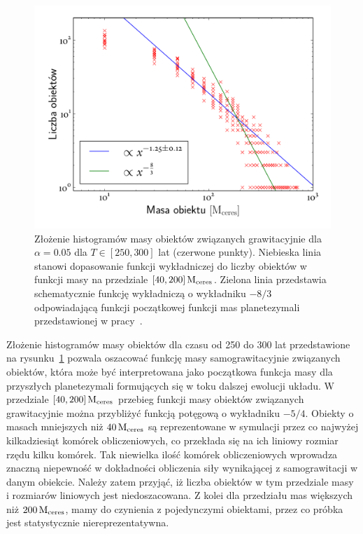 \begin{figure}[ht]
   \centering
   \includegraphics[width=0.7\linewidth]{figures/mass_func}
   \caption{Złożenie histogramów masy obiektów związanych grawitacyjnie dla
   $\alpha = 0.05$ dla $T \in [250, 300]$ lat (czerwone punkty). Niebieska linia
stanowi dopasowanie funkcji wykładniczej do liczby obiektów w funkcji masy na
przedziale $[40,200]\hbox{$\mathrm{\thinspace M_{\textrm{ceres}}}$}$. Zielona linia przedstawia schematycznie funkcję
wykładniczą o wykładniku $-8/3$ odpowiadającą funkcji początkowej funkcji mas
planetezymali przedstawionej w pracy~\cite{MFFK98}.}
   \label{fig:massfun}
\end{figure}
%
\par Złożenie histogramów masy obiektów dla czasu od 250 do 300 lat
przedstawione na rysunku~\ref{fig:massfun} pozwala oszacować funkcję masy
samograwitacyjnie związanych obiektów, która może być interpretowana jako
początkowa funkcja masy dla przyszłych planetezymali formujących się w toku
dalszej ewolucji układu. W przedziale $[40, 200]\hbox{$\mathrm{\thinspace M_{\textrm{ceres}}}$}$ przebieg funkcji masy
obiektów związanych grawitacyjnie można przybliżyć funkcją potęgową o wykładniku
$-5/4$. Obiekty o masach mniejszych niż $40\hbox{$\mathrm{\thinspace M_{\textrm{ceres}}}$}$ są reprezentowane w
symulacji przez co najwyżej kilkadziesiąt komórek obliczeniowych, co przekłada
się na ich liniowy rozmiar rzędu kilku komórek. Tak niewielka ilość komórek
obliczeniowych wprowadza znaczną niepewność w dokładności obliczenia
siły wynikającej z samograwitacji w danym obiekcie. Należy zatem przyjąć, iż
liczba obiektów w tym przedziale masy i rozmiarów liniowych jest 
niedoszacowana. Z kolei dla przedziału mas większych niż $200\hbox{$\mathrm{\thinspace M_{\textrm{ceres}}}$}$, mamy
do czynienia z pojedynczymi obiektami, przez co próbka jest statystycznie
niereprezentatywna.
%
